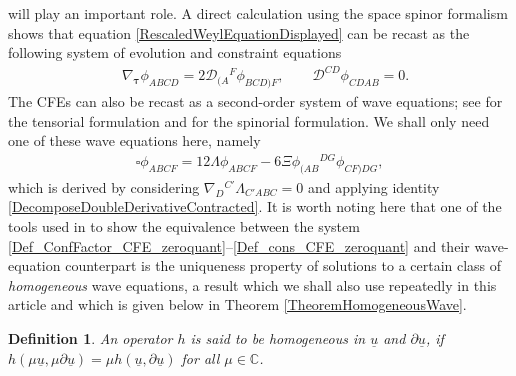 \documentclass[10pt,a4paper]{article}
\theoremstyle{plain}
\newtheorem*{definition}{Definition}
\begin{document}
will play an important role.  A direct calculation using the space
spinor formalism shows that equation
\eqref{RescaledWeylEquationDisplayed} can be recast as the following
system of evolution and constraint equations
\begin{align}\label{RescaledWeyl_evo_const}
  & \nabla_{\bm\tau} \phi _{ABCD} = 2 \mathcal{D}
  _{(A}{}^{F}\phi_{BCD)F}, \qquad \mathcal{D} ^{CD}\phi _{CDAB} = 0.
\end{align}
The CFEs can also be recast as a second-order system of wave
equations; see \cite{Pae13} for the tensorial formulation and
\cite{GasVal15} for the spinorial formulation.  We shall only need one
of these wave equations here, namely
\begin{eqnarray}
  \square \phi _{ABCF} = 12 \Lambda \phi _{ABCF} -6 \Xi \phi
  _{(AB}{}^{DG}\phi _{CF)DG},
  \label{Wave_eq_CFE_Weyl}
\end{eqnarray}
which is derived by considering $\nabla_D{}^{C'}\Lambda _{C'ABC}=0$ and
applying identity \eqref{DecomposeDoubleDerivativeContracted}.  It is
worth noting here that one of the tools used in \cite{GasVal15} to
show the equivalence between the system
\eqref{Def_ConfFactor_CFE_zeroquant}--\eqref{Def_cons_CFE_zeroquant}
and their wave-equation counterpart is the uniqueness property of
solutions to a certain class of \textit{homogeneous} wave equations, a
result which we shall also use repeatedly in this article and which is given below in
Theorem \ref{TheoremHomogeneousWave}.

\begin{definition}
{\em An operator $h$ is said to be \textit{homogeneous in} $\underline{u}$
\textit{and} $\partial\underline{u}$, if
$h (\mu\underline{u},\mu\partial\underline{u})=\mu
h(\underline{u}, \partial\underline{u})$ for all
$\mu\in\mathbb{C}$. }
\end{definition}
\end{document}

